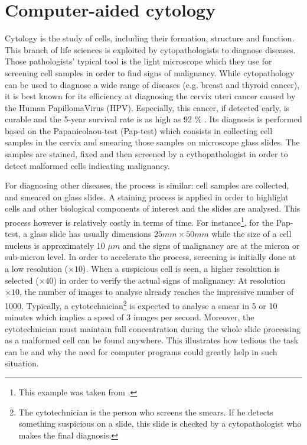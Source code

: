 \section{Computer-aided cytology}
\label{sec:cadc}
Cytology is the study of cells, including their formation, structure and function. This branch of life sciences is exploited by cytopathologists to diagnose diseases. Those pathologists' typical tool is the light microscope which they use for screening cell samples in order to find signs of malignancy. While cytopathology can be used to diagnose a wide range of diseases (e.g. breast and thyroid cancer), it is best known for its efficiency at diagnosing the cervix uteri cancer caused by the Human PapillomaVirus (HPV). Especially, this cancer, if detected early, is curable and the 5-year survival rate is as high as 92 \% \cite{bengtsson2014screening}. Its diagnosis is performed based on the Papanicolaou-test (Pap-test) which consists in collecting cell samples in the cervix and smearing those samples on microscope glass slides. The samples are stained, fixed and then screened by a cythopathologist in order to detect malformed cells indicating malignancy. 

For diagnosing other diseases, the process is similar: cell samples are collected, and smeared on glass slides. A staining process is applied in order to highlight cells and other biological components of interest and the slides are analysed. This process however is relatively costly in terms of time. For instance\footnote{This example was taken from \cite{bengtsson2014screening}.}, for the Pap-test, a glass slide has usually dimensions $25mm \times 50mm$ while the size of a cell nucleus is approximately 10 $\mu m$ and the signs of malignancy are at the micron or sub-micron level. In order to accelerate the process, screening is initially done at a low resolution ($\times 10$). When a suspicious cell is seen, a higher resolution is selected ($\times 40$) in order to verify the actual signs of malignancy. 
At resolution $\times 10$, the number of images to analyse already reaches the impressive number of 1000. Typically, a cytotechnician\footnote{The cytotechnician is the person who screens the smears. If he detects something suspicious on a slide, this slide is checked by a cytopathologist who makes the final diagnosis.} is expected to analyse a smear in 5 or 10 minutes which implies a speed of 3 images per second. Moreover, the cytotechnician must maintain full concentration during the whole slide processing as a malformed cell can be found anywhere. This illustrates how tedious the task can be and why the need for computer programs could greatly help in such situation. 

